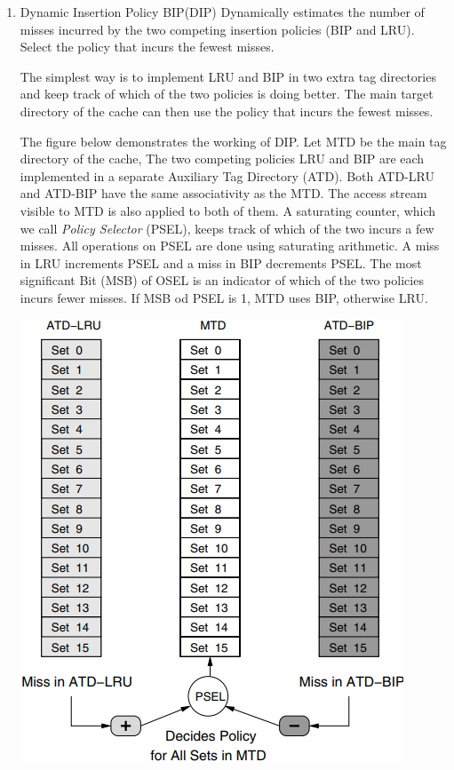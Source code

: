 \documentclass[letterpaper,12pt]{article}
\begin{document}
\begin{enumerate}
    \item Dynamic Insertion Policy BIP(DIP)
          Dynamically estimates the number of misses incurred by the two competing insertion policies (BIP and LRU). Select the policy that incurs the fewest misses.

          The simplest way is to implement LRU and BIP in two extra tag directories and keep track of which of the two policies is doing better. The main target directory of the cache can then use the policy that incurs the fewest misses.

          The figure below demonstrates the working of DIP. Let MTD be the main tag directory of the cache, The two competing policies LRU and BIP are each implemented in a separate Auxiliary Tag Directory (ATD). Both ATD-LRU and ATD-BIP have the same associativity as the MTD. The access stream visible to MTD is also applied to both of them. A saturating counter, which we call \textit{Policy Selector} (PSEL), keeps track of which of the two incurs a few misses. All operations on PSEL are done using saturating arithmetic. A miss in LRU increments PSEL and a miss in BIP decrements PSEL. The most significant Bit (MSB) of OSEL is an indicator of which of the two policies incurs fewer misses. If MSB od PSEL is 1, MTD uses BIP, otherwise LRU.

          \includegraphics*[scale=0.7]{./Image/DIP.png}


\end{enumerate}
\end{document}
